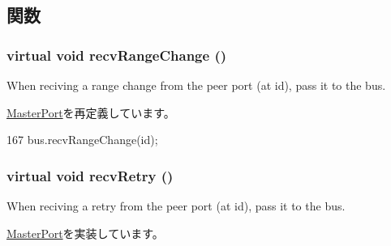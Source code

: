 \subsection{関数}
\hypertarget{classNoncoherentBus_1_1NoncoherentBusMasterPort_af60d9c2c17fb4c9ebc5384a7e0c9f289}{
\subsubsection[{recvRangeChange}]{\setlength{\rightskip}{0pt plus 5cm}virtual void recvRangeChange ()}}
\label{classNoncoherentBus_1_1NoncoherentBusMasterPort_af60d9c2c17fb4c9ebc5384a7e0c9f289}
When reciving a range change from the peer port (at id), pass it to the bus. 

\hyperlink{classMasterPort_af60d9c2c17fb4c9ebc5384a7e0c9f289}{MasterPort}を再定義しています。


\begin{DoxyCode}
167         { bus.recvRangeChange(id); }
\end{DoxyCode}
\hypertarget{classNoncoherentBus_1_1NoncoherentBusMasterPort_a7ec461ad187b82b4b21e27c86e45cf9c}{
\subsubsection[{recvRetry}]{\setlength{\rightskip}{0pt plus 5cm}virtual void recvRetry ()}}
\label{classNoncoherentBus_1_1NoncoherentBusMasterPort_a7ec461ad187b82b4b21e27c86e45cf9c}
When reciving a retry from the peer port (at id), pass it to the bus. 

\hyperlink{classMasterPort_ac1ccc3bcf7ebabb20b57fab99b2be5b0}{MasterPort}を実装しています。


